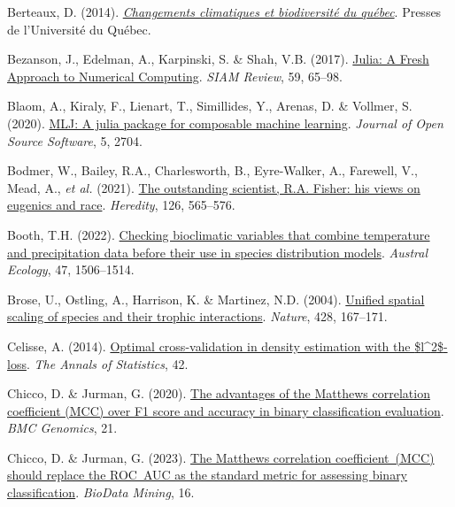 \documentclass[
  letterpaper,
]{scrbook}
\newlength{\cslhangindent}
\newenvironment{CSLReferences}[2] %
 {\begin{list}{}{%
  \setlength{\itemindent}{0pt}
  \setlength{\leftmargin}{0pt}
  \setlength{\parsep}{0pt}
  \ifodd #1
   \setlength{\leftmargin}{\cslhangindent}
   \setlength{\itemindent}{-1\cslhangindent}
  \fi
  \setlength{\itemsep}{#2\baselineskip}}}
 {\end{list}}
\begin{document}
\begin{CSLReferences}{1}{0}
Berteaux, D. (2014).
\emph{\href{https://doi.org/10.1353/book35753}{Changements climatiques
et biodiversité du québec}}. Presses de l'Université du Québec.

Bezanson, J., Edelman, A., Karpinski, S. \& Shah, V.B. (2017).
\href{https://doi.org/10.1137/141000671}{Julia: A Fresh Approach to
Numerical Computing}. \emph{SIAM Review}, 59, 65--98.

Blaom, A., Kiraly, F., Lienart, T., Simillides, Y., Arenas, D. \&
Vollmer, S. (2020). \href{https://doi.org/10.21105/joss.02704}{MLJ: A
julia package for composable machine learning}. \emph{Journal of Open
Source Software}, 5, 2704.

Bodmer, W., Bailey, R.A., Charlesworth, B., Eyre-Walker, A., Farewell,
V., Mead, A., \emph{et al.} (2021).
\href{https://doi.org/10.1038/s41437-020-00394-6}{The outstanding
scientist, R.A. Fisher: his views on eugenics and race}.
\emph{Heredity}, 126, 565--576.

Booth, T.H. (2022). \href{https://doi.org/10.1111/aec.13234}{Checking
bioclimatic variables that combine temperature and precipitation data
before their use in species distribution models}. \emph{Austral
Ecology}, 47, 1506--1514.

Brose, U., Ostling, A., Harrison, K. \& Martinez, N.D. (2004).
\href{https://doi.org/10.1038/nature02297}{Unified spatial scaling of
species and their trophic interactions}. \emph{Nature}, 428, 167--171.

Celisse, A. (2014). \href{https://doi.org/10.1214/14-aos1240}{Optimal
cross-validation in density estimation with the
{\$}l{\^{}}{\textbraceleft}2{\textbraceright}{\$}-loss}. \emph{The
Annals of Statistics}, 42.

Chicco, D. \& Jurman, G. (2020).
\href{https://doi.org/10.1186/s12864-019-6413-7}{The advantages of the
Matthews correlation coefficient (MCC) over F1 score and accuracy in
binary classification evaluation}. \emph{BMC Genomics}, 21.

Chicco, D. \& Jurman, G. (2023).
\href{https://doi.org/10.1186/s13040-023-00322-4}{The Matthews
correlation coefficient~(MCC) should replace the ROC~AUC as the standard
metric for assessing binary classification}. \emph{BioData Mining}, 16.


\end{CSLReferences}
\end{document}

